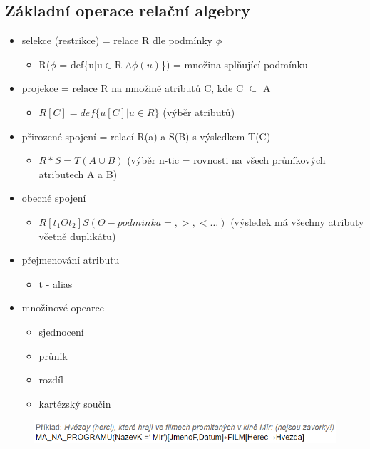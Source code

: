 \documentclass{szzclass}
\begin{document}
\subsection{Základní operace relační algebry}
\begin{itemize}
  \item selekce (restrikce) = relace R dle podmínky $\phi$
  \begin{itemize}
    \item R($\phi$ = def\{u$|$u$\in$R $\wedge \phi (u)$\}) = množina splňující podmínku
  \end{itemize}
  \item projekce = relace R na množině atributů C, kde C $\subseteq$ A
  \begin{itemize}
    \item $R[C] = def \{u[C] | u \in R\}$ (výběr atributů)
  \end{itemize}
  \item přirozené spojení = relací R(a) a S(B) s výsledkem T(C)
  \begin{itemize}
    \item $R*S = T(A \cup B)$ (výběr n-tic = rovnosti na všech průníkových atributech A a B)
  \end{itemize}
  \item obecné spojení
  \begin{itemize}
    \item $R[t_1 \Theta t_2]S (\Theta - podminka =, >, <\dots)$ (výsledek má všechny atributy včetně duplikátu)
  \end{itemize}
  \item přejmenování atributu
  \begin{itemize}
    \item t - alias
  \end{itemize}
  \item množinové opearce
  \begin{itemize}
    \item sjednocení
    \item průnik
    \item rozdíl
    \item kartézský součin
  \end{itemize}
\end{itemize}

\begin{figure}[h!]
  \centering
  \includegraphics[width = \textwidth ]{topics/bi-spol-09/images/RaExample.png}
\end{figure}
\end{document}
